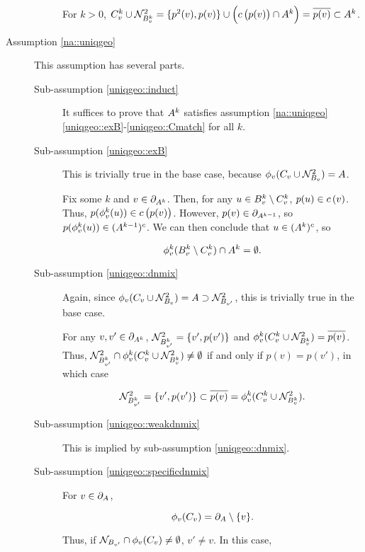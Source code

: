 \begin{description}
\begin{description}
For \(k >0\), \(C^{k}_v\cup\mathcal{N}^2_{B^{k}_v} = \{p^2(v),p(v)\}\cup \left(c\left(p(v)\right)\cap A^{k}\right) = \overline{p(v)} \subset A^{k}\).
\end{description}

\item[Assumption \ref{na::uniqgeo}] This assumption has several parts. 

\begin{description}
\item[Sub-assumption \ref{uniqgeo::induct}] It suffices to prove that \(A^{k}\) satisfies assumption \ref{na::uniqgeo}\ref{uniqgeo::exB}-\ref{uniqgeo::Cmatch} for all \(k\).

\item[Sub-assumption \ref{uniqgeo::exB}] This is trivially true in the base case, because \(\phi_v(C_v\cup\mathcal{N}^2_{B_v}) = A\).

\ind Fix some \(k\) and \(v \in \partial_{A^{k}}\). Then, for any \(u \in B^{k}_v\setminus C^{k}_v\), \(p(u) \in c\left(v\right)\). Thus, \(p(\phi^{k}_v(u)) \in c\left(p(v)\right)\). However, \(p(v) \in \partial_{A^{k-1}}\), so \(p(\phi^{k}_v(u)) \in (A^{k-1})^c\). We can then conclude that \(u \in (A^{k})^c\), so

\[\phi^{k}_v(B^{k}_v\setminus C^{k}_v) \cap A^{k} = \emptyset.\]

\item[Sub-assumption \ref{uniqgeo::dnmix}] Again, since \(\phi_v(C_v\cup\mathcal{N}^2_{B_v}) = A\supset \mathcal{N}^2_{B_{v'}}\), this is trivially true in the base case.

\ind For any \(v,v' \in \partial_{A^{k}}\), \(\mathcal{N}^2_{B^{k}_{v'}} = \{v',p(v')\}\) and \(\phi^{k}_v(C^{k}_v\cup\mathcal{N}^2_{B^{k}_v}) = \overline{p(v)}\). Thus, \(\mathcal{N}^2_{B^{k}_{v'}}\cap\phi^{k}_v(C^{k}_v\cup\mathcal{N}^2_{B^{k}_v})\neq \emptyset\) if and only if \(p(v) = p(v')\), in which case 

\[\mathcal{N}^2_{B^{k}_{v'}} = \{v',p(v')\} \subset \overline{p(v)} = \phi^{k}_v(C^{k}_v\cup\mathcal{N}^2_{B^{k}_v}).\]

\item[Sub-assumption \ref{uniqgeo::weakdnmix}] This is implied by sub-assumption \ref{uniqgeo::dnmix}.

\item[Sub-assumption \ref{uniqgeo::specificdnmix}] For \(v \in \partial_{A}\),

\[\phi_v(C_v) = \partial_{A}\setminus\{v\}.\]

Thus, if \(\mathcal{N}_{B_{v'}} \cap \phi_v(C_v) \neq \emptyset\), \(v' \neq v\). In this case,


\end{description}
\end{description}
